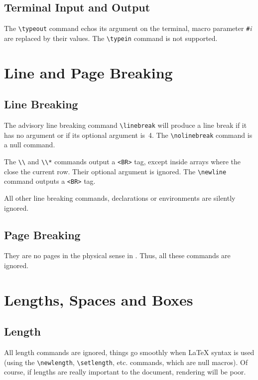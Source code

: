 \subsection{Terminal Input and Output}

The \verb+\typeout+ command echos its argument on the
terminal, macro parameter \verb+#+\textit{i} are replaced by their values.
The \verb+\typein+ command is not supported.

\section{Line and Page Breaking}

\subsection{Line Breaking}
The advisory line breaking command \verb+\linebreak+
will produce a line break if it has no argument or if its optional
argument is~4.
The \verb+\nolinebreak+ command is a null command.


The \verb+\\+ and \verb+\\*+ commands output a \verb+<BR>+ tag,
except inside arrays where the close the current row.
Their optional argument is ignored.
The \verb+\newline+ command outputs a \verb+<BR>+ tag.

All other line breaking commands, declarations or environments are
silently ignored.

\subsection{Page Breaking}
They are no pages in the physical sense in \html. Thus, all these
commands are ignored.

\section{Lengths, Spaces and Boxes}

\subsection{Length}

All length commands are ignored, things go smoothly when \LaTeX{} syntax is
used (using the \verb+\newlength+, \verb+\setlength+, etc. commands,
which are null macros).
Of course, if lengths are really important to the document, rendering
will be poor.

